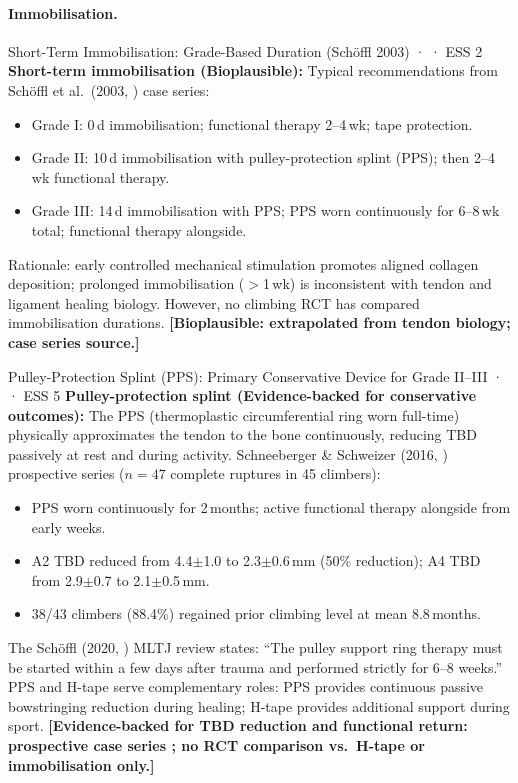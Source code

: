 \paragraph{Immobilisation.}\leavevmode

\begin{bioplausbox}{Short-Term Immobilisation: Grade-Based Duration (Schöffl 2003) · \bioplausible · ESS 2}
\textbf{Short-term immobilisation (Bioplausible):} Typical recommendations from Sch\"{o}ffl et al.\ (2003, \cite{SHWS03}) case series:
\begin{itemize}[leftmargin=1.5em,noitemsep]
  \item Grade I: 0\,d immobilisation; functional therapy 2--4\,wk; tape protection.
  \item Grade II: 10\,d immobilisation with pulley-protection splint (PPS); then 2--4\,wk functional therapy.
  \item Grade III: 14\,d immobilisation with PPS; PPS worn continuously for 6--8\,wk total; functional therapy alongside.
\end{itemize}
Rationale: early controlled mechanical stimulation promotes aligned collagen deposition; prolonged immobilisation ($>$1\,wk) is inconsistent with tendon and ligament healing biology. However, no climbing RCT has compared immobilisation durations. \textbf{[Bioplausible: extrapolated from tendon biology; case series source.]}
\end{bioplausbox}

\begin{evidencebox}{Pulley-Protection Splint (PPS): Primary Conservative Device for Grade II--III · \evidencebacked · ESS 5}
\textbf{Pulley-protection splint (Evidence-backed for conservative outcomes):} The PPS (thermoplastic circumferential ring worn full-time) physically approximates the tendon to the bone continuously, reducing TBD passively at rest and during activity. Schneeberger \& Schweizer (2016, \cite{SS16}) prospective series ($n=47$ complete ruptures in 45 climbers):
\begin{itemize}[leftmargin=1.5em,noitemsep]
  \item PPS worn continuously for 2\,months; active functional therapy alongside from early weeks.
  \item A2 TBD reduced from 4.4$\pm$1.0 to 2.3$\pm$0.6\,mm (50\% reduction); A4 TBD from 2.9$\pm$0.7 to 2.1$\pm$0.5\,mm.
  \item 38/43 climbers (88.4\%) regained prior climbing level at mean 8.8\,months.
\end{itemize}
The Sch\"{o}ffl (2020, \cite{SSF+20}) MLTJ review states: ``The pulley support ring therapy must be started within a few days after trauma and performed strictly for 6--8 weeks.'' PPS and H-tape serve complementary roles: PPS provides continuous passive bowstringing reduction during healing; H-tape provides additional support during sport. \textbf{[Evidence-backed for TBD reduction and functional return: prospective case series \cite{SS16}; no RCT comparison vs.\ H-tape or immobilisation only.]}
\end{evidencebox}

